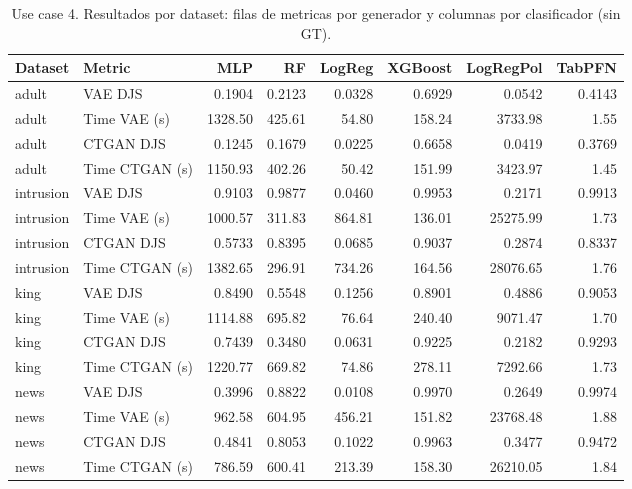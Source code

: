 \begin{table}[t]
\centering
\caption{Use case 4. Resultados por dataset: filas de metricas por generador y columnas por clasificador (sin GT).}
\label{tab:uc4_by_classifier_transposed}
\begin{tabular}{llrrrrrr}
\toprule
Dataset & Metric & MLP & RF & LogReg & XGBoost & LogRegPol & TabPFN \\
\midrule
adult & VAE DJS & 0.1904 & 0.2123 & 0.0328 & 0.6929 & 0.0542 & 0.4143 \\
adult & Time VAE (s) & 1328.50 & 425.61 & 54.80 & 158.24 & 3733.98 & 1.55 \\
adult & CTGAN DJS & 0.1245 & 0.1679 & 0.0225 & 0.6658 & 0.0419 & 0.3769 \\
adult & Time CTGAN (s) & 1150.93 & 402.26 & 50.42 & 151.99 & 3423.97 & 1.45 \\
\midrule
intrusion & VAE DJS & 0.9103 & 0.9877 & 0.0460 & 0.9953 & 0.2171 & 0.9913 \\
intrusion & Time VAE (s) & 1000.57 & 311.83 & 864.81 & 136.01 & 25275.99 & 1.73 \\
intrusion & CTGAN DJS & 0.5733 & 0.8395 & 0.0685 & 0.9037 & 0.2874 & 0.8337 \\
intrusion & Time CTGAN (s) & 1382.65 & 296.91 & 734.26 & 164.56 & 28076.65 & 1.76 \\
\midrule
king & VAE DJS & 0.8490 & 0.5548 & 0.1256 & 0.8901 & 0.4886 & 0.9053 \\
king & Time VAE (s) & 1114.88 & 695.82 & 76.64 & 240.40 & 9071.47 & 1.70 \\
king & CTGAN DJS & 0.7439 & 0.3480 & 0.0631 & 0.9225 & 0.2182 & 0.9293 \\
king & Time CTGAN (s) & 1220.77 & 669.82 & 74.86 & 278.11 & 7292.66 & 1.73 \\
\midrule
news & VAE DJS & 0.3996 & 0.8822 & 0.0108 & 0.9970 & 0.2649 & 0.9974 \\
news & Time VAE (s) & 962.58 & 604.95 & 456.21 & 151.82 & 23768.48 & 1.88 \\
news & CTGAN DJS & 0.4841 & 0.8053 & 0.1022 & 0.9963 & 0.3477 & 0.9472 \\
news & Time CTGAN (s) & 786.59 & 600.41 & 213.39 & 158.30 & 26210.05 & 1.84 \\
\bottomrule
\end{tabular}
\end{table}